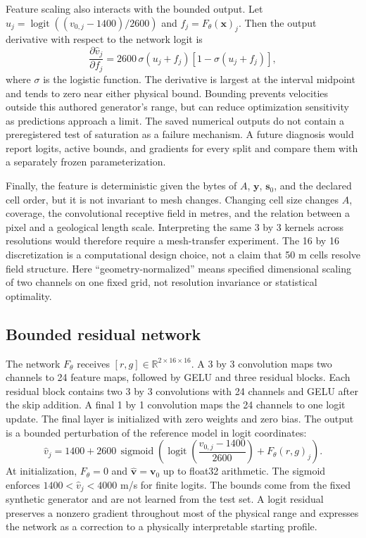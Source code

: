 \documentclass[11pt]{article}
\begin{document}
Feature scaling also interacts with the bounded output. Let $u_j=\operatorname{logit}((v_{0,j}-1400)/2600)$ and $f_j=F_\theta(\mathbf{x})_j$. Then the output derivative with respect to the network logit is
\begin{equation}
\frac{\partial\widehat v_j}{\partial f_j}=2600\,\sigma(u_j+f_j)\left[1-\sigma(u_j+f_j)\right],
\label{eq:bounded-derivative}
\end{equation}
where $\sigma$ is the logistic function. The derivative is largest at the interval midpoint and tends to zero near either physical bound. Bounding prevents velocities outside this authored generator's range, but can reduce optimization sensitivity as predictions approach a limit. The saved numerical outputs do not contain a preregistered test of saturation as a failure mechanism. A future diagnosis would report logits, active bounds, and gradients for every split and compare them with a separately frozen parameterization.

Finally, the feature is deterministic given the bytes of $A$, $\mathbf{y}$, $\mathbf{s}_0$, and the declared cell order, but it is not invariant to mesh changes. Changing cell size changes $A$, coverage, the convolutional receptive field in metres, and the relation between a pixel and a geological length scale. Interpreting the same 3 by 3 kernels across resolutions would therefore require a mesh-transfer experiment. The 16 by 16 discretization is a computational design choice, not a claim that 50 m cells resolve field structure. Here “geometry-normalized” means specified dimensional scaling of two channels on one fixed grid, not resolution invariance or statistical optimality.

\subsection{Bounded residual network}
\label{sec:network}
The network $F_{\theta}$ receives $[r,g]\in\mathbb{R}^{2\times16\times16}$. A 3 by 3 convolution maps two channels to 24 feature maps, followed by GELU and three residual blocks. Each residual block contains two 3 by 3 convolutions with 24 channels and GELU after the skip addition. A final 1 by 1 convolution maps the 24 channels to one logit update. The final layer is initialized with zero weights and zero bias. The output is a bounded perturbation of the reference model in logit coordinates:
\begin{equation}
\widehat{v}_j=1400+2600\,\operatorname{sigmoid}\!\left(\operatorname{logit}\left(\frac{v_{0,j}-1400}{2600}\right)+F_{\theta}(r,g)_j\right).
\label{eq:bounded}
\end{equation}
At initialization, $F_{\theta}=0$ and $\widehat{\mathbf{v}}=\mathbf{v}_0$ up to float32 arithmetic. The sigmoid enforces $1400<\widehat{v}_j<4000$ m/s for finite logits. The bounds come from the fixed synthetic generator and are not learned from the test set. A logit residual preserves a nonzero gradient throughout most of the physical range and expresses the network as a correction to a physically interpretable starting profile.
\end{document}
